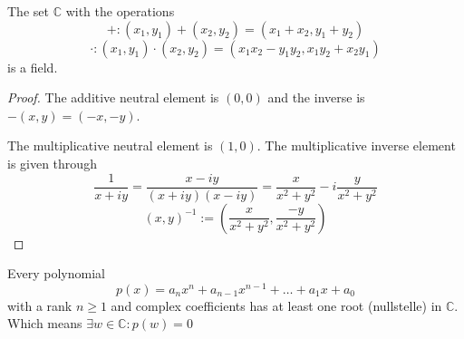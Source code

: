 



\begin{proposition}
   The set \(\mathbb{C}\) with the operations
   \[+: (x_1, y_1) + (x_2, y_2) = (x_1 + x_2, y_1 + y_2)\]
   \[\cdot: (x_1, y_1) \cdot (x_2, y_2) = (x_1x_2 - y_1y_2, x_1y_2 + x_2y_1)\]
   is a field.
\end{proposition}
\begin{proof}
   The additive neutral element is \((0, 0)\) and the inverse is \(-(x, y) = (-x, -y)\).

   The multiplicative neutral element is \((1, 0)\).
   The multiplicative inverse element is given through
   \[\frac{1}{x + iy} = \frac{x - iy}{(x+iy)(x-iy)} = \frac{x}{x^2 + y^2} - i\frac{y}{x^2 + y^2}\]
   \[(x, y)^{-1} := \left(\frac{x}{x^2 + y^2}, \frac{-y}{x^2 + y^2}\right)\]
\end{proof}


\begin{theorem}
   Every polynomial
   \[p(x) = a_nx^n + a_{n-1}x^{n-1} + \ldots + a_1x + a_0\]
   with a rank \(n \geq 1\) and complex coefficients has at least one root (nullstelle) in \(\mathbb{C}\).
   Which means \(\exists w \in \mathbb{C}: p(w) = 0\)
\end{theorem}
